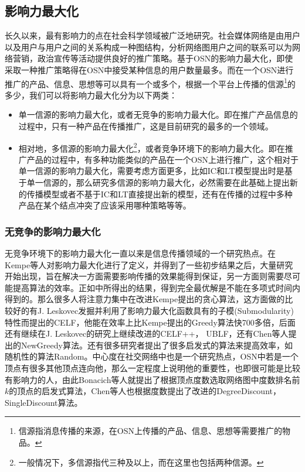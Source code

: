 \subsection{影响力最大化}
长久以来，最有影响力的点在社会科学领域被广泛地研究\cite{lu2011leaders}\cite{qing2013new}\cite{zhuo2013node}\cite{kitsak2010identification}。社会媒体网络是由用户以及用户与用户之间的关系构成一种图结构，分析网络图用户之间的联系可以为网络营销，政治宣传等活动提供良好的推广策略。基于OSN的影响力最大化，即使采取一种推广策略得在OSN中接受某种信息的用户数量最多。而在一个OSN进行推广的产品、信息、思想等可以具有一个或多个，根据一个平台上传播的信源\footnote{信源指消息传播的来源，在OSN上传播的产品、信息、思想等需要推广的物品。}的多少，我们可以将影响力最大化分为以下两类：
\begin{itemize}
\item 单一信源的影响力最大化，或者无竞争的影响力最大化。即在推广产品信息的过程中，只有一种产品在传播推广，这是目前研究的最多的一个领域。
\item 相对地，多信源的影响力最大化\footnote{一般情况下，多信源指代三种及以上，而在这里也包括两种信源。}，或者竞争环境下的影响力最大化。即在推广产品的过程中，有多种功能类似的产品在一个OSN上进行推广，这个相对于单一信源的影响力最大化，需要考虑方面更多，比如IC和LT模型提出时是基于单一信源的，那么研究多信源的影响力最大化，必然需要在此基础上提出新的传播模型或者不基于IC和LT直接提出新的模型，还有在传播的过程中多种产品在某个结点冲突了应该采用哪种策略等等。
\end{itemize}


\subsubsection{无竞争的影响力最大化}
无竞争环境下的影响力最大化一直以来是信息传播领域的一个研究热点。在Kempe\cite{kempe2003maximizing}等人对影响力最大化进行了定义，并得到了一些初步结果之后，大量研究开始出现，旨在解决一方面需要影响传播的效果能得到保证，另一方面则需要尽可能提高算法的效率。正如\cite{kempe2003maximizing}中所得出的结果，得到完全最优解是不能在多项式时间内得到的。那么很多人将注意力集中在改进Kempe提出的贪心算法，这方面做的比较好的有J. Leskovec\cite{leskovec2007cost}发掘并利用了影响力最大化函数具有的子模(Submodularity)特性而提出的CELF，他能在效率上比Kempe提出的Greedy算法快700多倍，后面还有继续在J. Leskovec的研究上继续改进的CELF++\cite{goyal2011celf++}， UBLF\cite{zhou2013ublf}，还有Chen\cite{chen2009efficient}等人提出的NewGreedy算法。还有很多研究者提出了很多启发式的算法来提高效率，如随机性的算法Random\cite{kempe2003maximizing}\cite{chen2009efficient}。中心度在社交网络中也是一个研究热点，OSN中若是一个顶点有很多其他顶点连向他，那么一定程度上说明他的重要性，也即很可能是比较有影响力的人，由此Bonacich\cite{bonacich1972factoring}等人就提出了根据顶点度数选取网络图中度数排名前$k$的顶点的启发式算法，Chen\cite{chen2009efficient}等人也根据度数提出了改进的DegreeDiscount，SingleDiscount算法。


